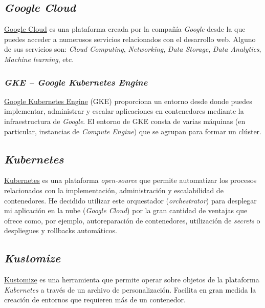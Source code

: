 \subsection{\emph{Google Cloud}}

\href{https://cloud.google.com/}{Google Cloud} es una plataforma creada
por la compañía \emph{Google} desde la que puedes acceder a numerosos
servicios relacionados con el desarrollo web. Alguno de sus servicios
son: \emph{Cloud Computing}, \emph{Networking}, \emph{Data Storage},
\emph{Data Analytics}, \emph{Machine learning}, etc.

\subsubsection{\emph{GKE -- Google Kubernetes Engine}}

\href{https://cloud.google.com/kubernetes-engine}{Google Kubernetes
Engine} (GKE) proporciona un entorno desde donde puedes implementar,
administrar y escalar aplicaciones en contenedores mediante la
infraestructura de \emph{Google}. El entorno de GKE consta de varias
máquinas (en particular, instancias de \emph{Compute Engine}) que se
agrupan para formar un clúster.

\subsection{\emph{Kubernetes}}

\href{https://kubernetes.io/es/}{Kubernetes} es una plataforma
\emph{open-source} que permite automatizar los procesos relacionados con
la implementación, administración y escalabilidad de contenedores. He
decidido utilizar este orquestador (\emph{orchestrator}) para desplegar
mi aplicación en la nube (\emph{Google Cloud}) por la gran cantidad de
ventajas que ofrece como, por ejemplo, autoreparación de contenedores,
utilización de \emph{secrets} o despliegues y rollbacks automáticos.

\subsection{\emph{Kustomize}}

\href{https://github.com/kubernetes-sigs/kustomize}{Kustomize} es una
herramienta que permite operar sobre objetos de la plataforma
\emph{Kubernetes} a través de un archivo de personalización. Facilita en gran medida
la creación de entornos que requieren más de un contenedor.